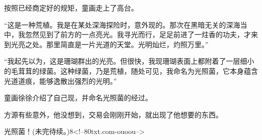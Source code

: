 \begin{this_body}
按照已经商定好的规矩，童画走上了高台。

“这是一种荒植。我是在某处深海探险时，意外现的。那次在黑暗无关的深海当中，我忽然见到了前方的一点亮光。我寻光而行，足足前进了一炷香的功夫，才来到光亮之处。那里简直是一片光道的天堂。光明灿烂，灼照万里。”

“我起先以为，这是珊瑚群出的光亮。但很快，我现珊瑚表面上都附着了一层细小的毛茸茸的绿菌。这种绿菌，乃是荒植，随处可见，我命名为光照菌，它本身蕴含光道道痕，能够逸散出强烈的光明。”

童画徐徐介绍了自己现，并命名光照菌的经过。

方源有些意外，他没想到，交易会刚刚开始，就出现了他想要的东西。

光照菌！(未完待续。)8<!--80txt.com-ouoou-->

\end{this_body}


